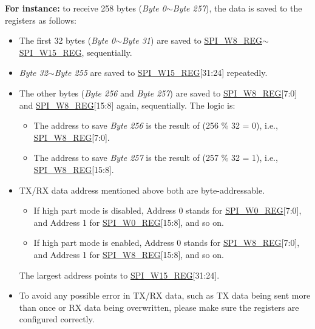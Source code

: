 \documentclass[main\_\_EN.tex]{subfiles}
\begin{document}
\begin{itemize}
\begin{itemize}
        \textbf{For instance:} to receive 258 bytes (\emph{Byte 0}$\sim$\emph{Byte 257}), the data is saved to the registers as follows:
        \begin{itemize}
            \item The first 32 bytes (\emph{Byte 0}$\sim$\emph{Byte 31}) are saved to \hyperref[regdesc:SPIW8REG]{SPI\_W8\_REG}$\sim$\hyperref[regdesc:SPIW15REG]{SPI\_W15\_REG}, sequentially.
            \item \emph{Byte 32}$\sim$\emph{Byte 255} are saved to \hyperref[regdesc:SPIW15REG]{SPI\_W15\_REG}[31:24] repeatedly. 
            \item The other bytes (\emph{Byte 256} and \emph{Byte 257}) are saved to \hyperref[regdesc:SPIW8REG]{SPI\_W8\_REG}[7:0] and \hyperref[regdesc:SPIW8REG]{SPI\_W8\_REG}[15:8] again, sequentially. The logic is:
            \begin{itemize}
                \item The address to save \emph{Byte 256} is the result of (256 \% 32 = 0), i.e., \hyperref[regdesc:SPIW8REG]{SPI\_W8\_REG}[7:0].
                \item The address to save \emph{Byte 257} is the result of (257 \% 32 = 1), i.e., \hyperref[regdesc:SPIW8REG]{SPI\_W8\_REG}[15:8].
            \end{itemize}
        \end{itemize}
    \end{itemize}
\end{itemize}

\begin{tiplisting}
\vspace{-2em}
\begin{itemize}
    \item TX/RX data address mentioned above both are byte-addressable. 
    \begin{itemize}
        \item If high part mode is disabled, Address 0 stands for \hyperref[regdesc:SPIW0REG]{SPI\_W0\_REG}[7:0], and Address 1 for \hyperref[regdesc:SPIW0REG]{SPI\_W0\_REG}[15:8], and so on. 
        \item If high part mode is enabled, Address 0 stands for \hyperref[regdesc:SPIW8REG]{SPI\_W8\_REG}[7:0], and Address 1 for \hyperref[regdesc:SPIW8REG]{SPI\_W8\_REG}[15:8], and so on. 
    \end{itemize}
    The largest address points to \hyperref[regdesc:SPIW15REG]{SPI\_W15\_REG}[31:24].
    \item To avoid any possible error in TX/RX data, such as TX data being sent more than once or RX data being overwritten, please make sure the registers are configured correctly.
\end{itemize}
\end{tiplisting}
\end{document}
